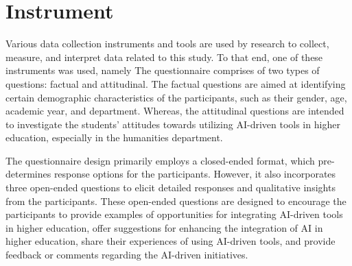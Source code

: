 \section{Instrument}
\justifying

Various data collection instruments and tools are used by research to collect, measure, and interpret data related to this study. 
To that end, one of these instruments was used, namely  The questionnaire comprises of two types 
of questions: factual and attitudinal. The factual questions are aimed at identifying certain demographic characteristics
of the participants, such as their gender, age, academic year, and department. Whereas, the attitudinal questions
are intended to investigate the students' attitudes towards utilizing AI-driven tools in higher education, 
especially in the humanities department. 


The questionnaire design primarily employs a closed-ended format, which pre-determines response 
options for the participants. However, it also incorporates three open-ended questions to elicit 
detailed responses and qualitative insights from the participants. These open-ended questions are 
designed to encourage the participants to provide examples of opportunities for integrating AI-driven 
tools in higher education, offer suggestions for enhancing the integration of AI in higher education, 
share their experiences of using AI-driven tools, and provide feedback or comments regarding the AI-driven initiatives.







